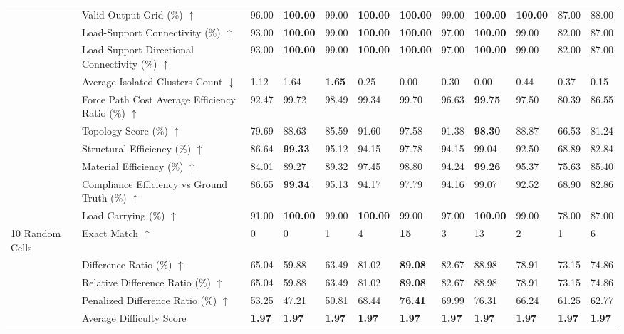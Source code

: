\begin{table}[!h]
{\begin{tabular}{llllllllllll}
 & Valid Output Grid (\%) $\uparrow$ & 96.00 & \textbf{100.00} & 99.00 & \textbf{100.00} & \textbf{100.00} & 99.00 & \textbf{100.00} & \textbf{100.00} & 87.00 & 88.00 \\
 & Load-Support Connectivity (\%) $\uparrow$ & 93.00 & \textbf{100.00} & 99.00 & \textbf{100.00} & \textbf{100.00} & 97.00 & \textbf{100.00} & 99.00 & 82.00 & 87.00 \\
 & Load-Support Directional Connectivity (\%) $\uparrow$ & 93.00 & \textbf{100.00} & 99.00 & \textbf{100.00} & \textbf{100.00} & 97.00 & \textbf{100.00} & 99.00 & 82.00 & 87.00 \\
 & Average Isolated Clusters Count $\downarrow$ & 1.12 & 1.64 & \textbf{1.65} & 0.25 & 0.00 & 0.30 & 0.00 & 0.44 & 0.37 & 0.15 \\
 & Force Path Cost Average Efficiency Ratio (\%) $\uparrow$ & 92.47 & 99.72 & 98.49 & 99.34 & 99.70 & 96.63 & \textbf{99.75} & 97.50 & 80.39 & 86.55 \\
 & Topology Score (\%) $\uparrow$ & 79.69 & 88.63 & 85.59 & 91.60 & 97.58 & 91.38 & \textbf{98.30} & 88.87 & 66.53 & 81.24 \\
 & Structural Efficiency (\%) $\uparrow$ & 86.64 & \textbf{99.33} & 95.12 & 94.15 & 97.78 & 94.15 & 99.04 & 92.50 & 68.89 & 82.84 \\
 & Material Efficiency (\%) $\uparrow$ & 84.01 & 89.27 & 89.32 & 97.45 & 98.80 & 94.24 & \textbf{99.26} & 95.37 & 75.63 & 85.40 \\
 & Compliance Efficiency vs Ground Truth (\%) $\uparrow$ & 86.65 & \textbf{99.34} & 95.13 & 94.17 & 97.79 & 94.16 & 99.07 & 92.52 & 68.90 & 82.86 \\
 & Load Carrying (\%) $\uparrow$ & 91.00 & \textbf{100.00} & 99.00 & \textbf{100.00} & 99.00 & 97.00 & \textbf{100.00} & 99.00 & 78.00 & 87.00 \\
10 Random Cells & Exact Match $\uparrow$ & 0 & 0 & 1 & 4 & \textbf{15} & 3 & 13 & 2 & 1 & 6 \\
 & Difference Ratio (\%) $\uparrow$ & 65.04 & 59.88 & 63.49 & 81.02 & \textbf{89.08} & 82.67 & 88.98 & 78.91 & 73.15 & 74.86 \\
 & Relative Difference Ratio (\%) $\uparrow$ & 65.04 & 59.88 & 63.49 & 81.02 & \textbf{89.08} & 82.67 & 88.98 & 78.91 & 73.15 & 74.86 \\
 & Penalized Difference Ratio (\%) $\uparrow$ & 53.25 & 47.21 & 50.81 & 68.44 & \textbf{76.41} & 69.99 & 76.31 & 66.24 & 61.25 & 62.77 \\
 & Average Difficulty Score & \textbf{1.97} & \textbf{1.97} & \textbf{1.97} & \textbf{1.97} & \textbf{1.97} & \textbf{1.97} & \textbf{1.97} & \textbf{1.97} & \textbf{1.97} & \textbf{1.97} \\

\end{tabular}}
\end{table}
